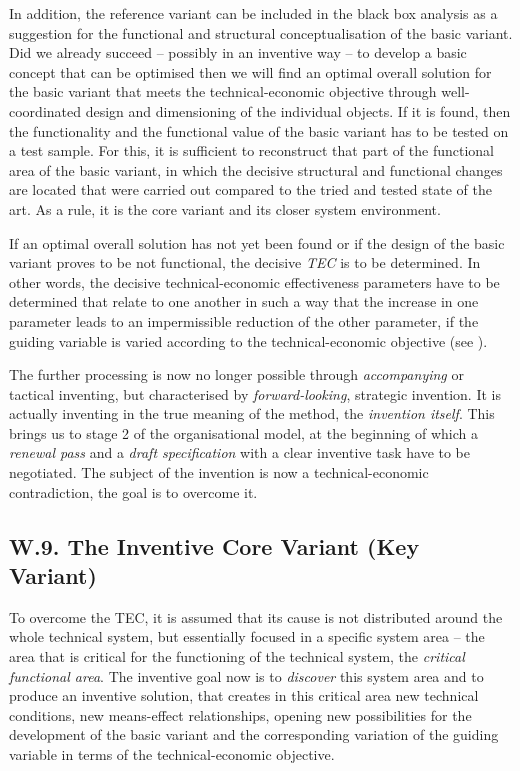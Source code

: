 \documentclass[11pt,a4paper]{article}
\begin{document}
In addition, the reference variant can be included in the black box analysis
as a suggestion for the functional and structural conceptualisation of the
basic variant. Did we already succeed -- possibly in an inventive way -- to
develop a basic concept that can be optimised then we will find an optimal
overall solution for the basic variant that meets the technical-economic
objective through well-coordinated design and dimensioning of the individual
objects. If it is found, then the functionality and the functional value of
the basic variant has to be tested on a test sample.  For this, it is
sufficient to reconstruct that part of the functional area of the basic
variant, in which the decisive structural and functional changes are located
that were carried out compared to the tried and tested state of the art. As a
rule, it is the core variant and its closer system environment.

If an optimal overall solution has not yet been found or if the design of the
basic variant proves to be not functional, the decisive \emph{TEC} is to be
determined.  In other words, the decisive technical-economic effectiveness
parameters have to be determined that relate to one another in such a way that
the increase in one parameter leads to an impermissible reduction of the other
parameter, if the guiding variable is varied according to the
technical-economic objective (see \cite[A.4]{RM-21}).

The further processing is now no longer possible through \emph{accompanying}
or tactical inventing, but characterised by \emph{forward-looking}, strategic
invention. It is actually inventing in the true meaning of the method, the
\emph{invention itself}. This brings us to stage 2 of the organisational
model, at the beginning of which a \emph{renewal pass} and a \emph{draft
  specification} with a clear inventive task have to be negotiated.  The
subject of the invention is now a technical-economic contradiction, the goal
is to overcome it.

\subsection*{W.9. The Inventive Core Variant (Key Variant)}

To overcome the TEC, it is assumed that its cause is not distributed around
the whole technical system, but essentially focused in a specific system area
-- the area that is critical for the functioning of the technical system, the
\emph{critical functional area}. The inventive goal now is to \emph{discover}
this system area and to produce an inventive solution, that creates in this
critical area new technical conditions, new means-effect relationships,
opening new possibilities for the development of the basic variant and the
corresponding variation of the guiding variable in terms of the
technical-economic objective.
\end{document}
